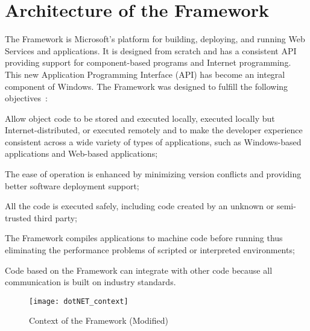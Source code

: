 \section{Architecture of the \dotNET Framework}
\label{sec:OverviewDotNetArchitecture}
The \dotNET Framework is Microsoft's platform for building, deploying, and running Web Services and applications. It is designed from scratch and has a consistent API providing support for component-based programs and Internet programming.
This new Application Programming Interface (API) has become an integral component of Windows. The \dotNET Framework was designed to fulfill the following objectives~\cite{Microsoft03-1}:

\begin{description}[noitemsep, style=nextline]
  \item[Consistency] Allow object code to be stored and executed locally, executed locally but Internet-distributed, or executed remotely and to make the developer experience consistent across a wide variety of types of applications, such as Windows-based applications and Web-based applications;
  \item[Operability] The ease of operation is enhanced by minimizing version conflicts and providing better software deployment support;
  \item[Security] All the code is executed safely, including code created by an unknown or semi-trusted third party;
  \item[Efficiency] The \dotNET Framework compiles applications to machine code before running thus eliminating the performance problems of scripted or interpreted environments;
  \item[Interoperability] Code based on the \dotNET Framework can integrate with other code because all communication is built on industry standards.
\end{description}

\begin{figure}[htbp]
 \centering
 \texttt{[image: dotNET\_context]}
 \caption[Context of the \dotNET framework]{Context of the \dotNET Framework (Modified)~\cite{Microsoft03-1}}
 \label{fig:dotNET_context}
\end{figure}

